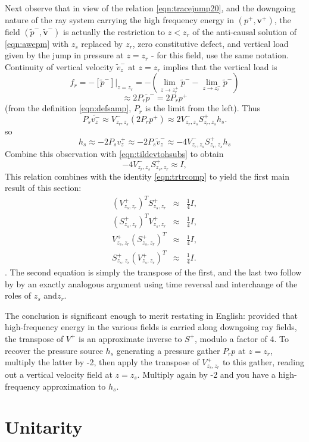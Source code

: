 \documentclass[georeport,12pt]{geophysics}
\newcommand{\bv}{\mathbf{v}}
\begin{document}
Next observe that in view of the relation \ref{eqn:tracejump20}, and
the downgoing nature of the ray system carrying the high frequency
energy in $(p^+,\bv^+)$, the field $(\tilde{p}^-,\tilde{\bv}^-)$ is
actually the restriction to $z<z_r$ of the anti-causal solution of \ref{eqn:awepm}
with $z_s$ replaced by $z_r$, zero constitutive defect, and vertical
load given by the jump in pressure at $z=z_r$ - for this field, use
the same notation. Continuity of vertical
velocity $\tilde{v}^-_z$ at $z=z_r$ implies that the vertical load is
\[
  f_r = -[\tilde{p}^-]|_{z=z_r} =-(\lim_{z\rightarrow
    z_r^+}\tilde{p}^- - \lim_{z\rightarrow
    z_r^-}\tilde{p}^-)
\]
\[
  \approx 2 P_r \tilde{p}^- = 2 P_r p^+
\]
(from the definition \ref{eqn:defsamp}, $P_r$ is the limit from the
left). Thus
\[
  P_s \tilde{v^-_z} \approx V^-_{z_r,z_s}(2 P_rp^+) \approx
  2V^-_{z_r,z_s}S^+_{z_r,z_s}h_s.
\]
so
\[
  h_s \approx -2 P_s v^+_z \approx -2 P_s \tilde{v}^-_z \approx
  -4V^-_{z_r,z_s}S^+_{z_r,z_s}h_s
\]
Combine this observation with \ref{eqn:tildevtohsubs} to obtain
\[
 -4  V^-_{z_r,z_s} S^+_{z_s,z_r}  \approx  I,
\]
This relation combines with the identity \ref{eqn:trtrcomp} to
yield the first main result of this section:
\begin{eqnarray}
  \label{eqn:approxinv}
  (V^+_{z_s,z_r})^T S^+_{z_s,z_r} & \approx & \frac{1}{4}I, \nonumber\\
  (S^+_{z_s,z_r})^T V^+_{z_s,z_r} & \approx & \frac{1}{4}I, \nonumber\\
  V^+_{z_s,z_r} (S^+_{z_s,z_r})^T & \approx & \frac{1}{4}I, \nonumber\\
  S^+_{z_s,z_r} (V^+_{z_s,z_r})^T & \approx & \frac{1}{4}I.
\end{eqnarray}.
The second equation is simply the transpose of the first, and the
last two follow by by an exactly analogous argument using time
reversal and interchange of the roles of $z_s$ and$z_r$.

The conclusion is significant enough to merit restating in English:
provided that high-frequency energy in the various fields is carried
along downgoing ray fields, the transpose of $V^+$ is an approximate
inverse to $S^+$, modulo a factor of 4. To recover the pressure source
$h_s$ generating a pressure gather $P_rp$ at $z=z_r$, multiply the
latter by -2, then apply the transpose of $V^+_{z_s,z_r}$ to this
gather, reading out a vertical velocity field at $z=z_s$. Multiply
again by -2 and you have a high-frequency approximation to $h_s$.


\section{Unitarity}
\end{document}
